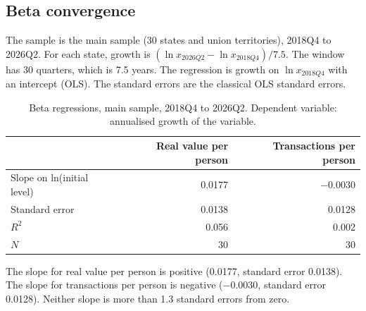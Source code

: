 \documentclass[11pt,a4paper]{article}
\begin{document}
\subsection{Beta convergence}\label{sec:beta}
The sample is the main sample (30 states and union territories), 2018Q4 to 2026Q2. For each state, growth is $(\ln x_{2026Q2} - \ln x_{2018Q4})/7.5$. The window has 30 quarters, which is 7.5 years. The regression is growth on $\ln x_{2018Q4}$ with an intercept (OLS). The standard errors are the classical OLS standard errors.
\begin{table}[h]
\centering
\caption{Beta regressions, main sample, 2018Q4 to 2026Q2. Dependent variable: annualised growth of the variable.}
\begin{tabular}{lrr}
\toprule
 & Real value per person & Transactions per person \\
\midrule
Slope on ln(initial level) & 0.0177 & $-0.0030$ \\
Standard error & 0.0138 & 0.0128 \\
$R^2$ & 0.056 & 0.002 \\
$N$ & 30 & 30 \\
\bottomrule
\end{tabular}
\end{table}
The slope for real value per person is positive (0.0177, standard error 0.0138). The slope for transactions per person is negative ($-0.0030$, standard error 0.0128). Neither slope is more than 1.3 standard errors from zero.
\end{document}
